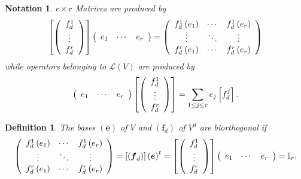 \documentclass[aps,preprint]{revtex4}%
\newtheorem{definition}[theorem]{Definition}
\newtheorem{notation}[theorem]{Notation}
\begin{document}
\begin{notation}
$r\times r$ Matrices are produced by
\begin{equation}
\left[  \left(
\begin{array}
[c]{c}%
f_{d}^{1}\\
\vdots\\
f_{d}^{r}%
\end{array}
\right)  \right]  \left(
\begin{array}
[c]{ccc}%
e_{1} & \cdots & e_{r}%
\end{array}
\right)  =\left(
\begin{array}
[c]{ccc}%
f_{d}^{1}\left(  e_{1}\right)  & \cdots & f_{d}^{1}\left(  e_{r}\right) \\
\vdots & \ddots & \vdots\\
f_{d}^{r}\left(  e_{1}\right)  & \cdots & f_{d}^{r}\left(  e_{r}\right)
\end{array}
\right)
\end{equation}
while operators belonging to $\mathcal{L}\left(  V\right)  $ are produced by
\begin{equation}
\left(
\begin{array}
[c]{ccc}%
e_{1} & \cdots & e_{r}%
\end{array}
\right)  \left[  \left(
\begin{array}
[c]{c}%
f_{d}^{1}\\
\vdots\\
f_{d}^{r}%
\end{array}
\right)  \right]  =\sum_{1\leq j\leq r}e_{j}\left[  f_{d}^{j}\right]  .
\end{equation}

\end{notation}

\begin{definition}
The bases $\left(  \boldsymbol{e}\right)  $ of $V$ and $\left(  \boldsymbol{f}%
_{d}\right)  $ of $V^{d}$ are biorthogonal if
\begin{equation}
\left(
\begin{array}
[c]{ccc}%
f_{d}^{1}\left(  e_{1}\right)  & \cdots & f_{d}^{1}\left(  e_{r}\right) \\
\vdots & \ddots & \vdots\\
f_{d}^{r}\left(  e_{1}\right)  & \cdots & f_{d}^{r}\left(  e_{r}\right)
\end{array}
\right)  =\left[  \left(  \boldsymbol{f}_{d}\right)  \right]  \left(
\boldsymbol{e}\right)  ^{t}=\left[  \left(
\begin{array}
[c]{c}%
f_{d}^{1}\\
\vdots\\
f_{d}^{r}%
\end{array}
\right)  \right]  \left(
\begin{array}
[c]{ccc}%
e_{1} & \cdots & e_{r}%
\end{array}
\right)  =\mathbb{I}_{r}.
\end{equation}

\end{definition}
\end{document}
